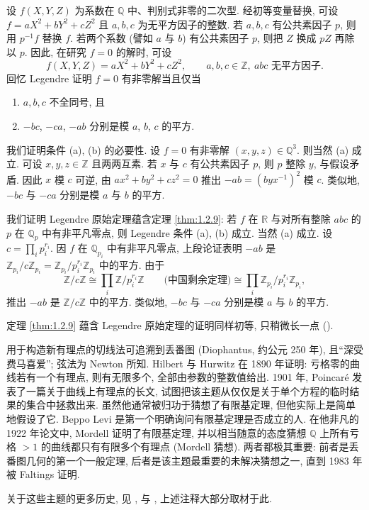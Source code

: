 \begin{aside} \label{thm:1.2.18} 
设 $f(X,Y,Z)$ 为系数在 $\mathbb{Q}$ 中、判别式非零的二次型. 经初等变量替换, 可设 $f = aX^2 + bY^2 + cZ^2$ 且 $a,b,c$ 为无平方因子的整数. 若 $a, b, c$ 有公共素因子 $p$, 则用 $p^{-1}f$ 替换 $f$. 若两个系数 (譬如 $a$ 与 $b$) 有公共素因子 $p$, 则把 $Z$ 换成 $pZ$ 再除以 $p$. 因此, 在研究 $f = 0$ 的解时, 可设
\[
f(X,Y,Z) = aX^2 + bY^2 + cZ^2, \qquad a,b,c\in\mathbb{Z}, \ abc \text{ 无平方因子}.
\]
回忆 Legendre 证明 $f = 0$ 有非零解当且仅当
\begin{enumerate}[label=\textup{(\alph*)}]
\item $a,b,c$ 不全同号, 且
\item $-bc$, $-ca$, $-ab$ 分别是模 $a$, $b$, $c$ 的平方.
\end{enumerate}
我们证明条件 (a), (b) 的必要性. 设 $f = 0$ 有非零解 $(x,y,z)\in\mathbb{Q}^3$. 则当然 (a) 成立. 可设 $x,y,z\in\mathbb{Z}$ 且两两互素. 若 $x$ 与 $c$ 有公共素因子 $p$, 则 $p$ 整除 $y$, 与假设矛盾. 因此 $x$ 模 $c$ 可逆, 由 $ax^2 + by^2 + cz^2 = 0$ 推出 $-ab = (byx^{-1})^2$ 模 $c$. 类似地, $-bc$ 与 $-ca$ 分别是模 $a$ 与 $b$ 的平方.

我们证明 Legendre 原始定理蕴含定理 \ref{thm:1.2.9}: 若 $f$ 在 $\mathbb{R}$ 与对所有整除 $abc$ 的 $p$ 在 $\mathbb{Q}_p$ 中有非平凡零点, 则 Legendre 条件 (a), (b) 成立. 当然 (a) 成立. 设 $c = \prod_i p_i^{r_i}$. 因 $f$ 在 $\mathbb{Q}_{p_i}$ 中有非平凡零点, 上段论证表明 $-ab$ 是 $\mathbb{Z}_{p_i}/c\mathbb{Z}_{p_i} = \mathbb{Z}_{p_i}/p_i^{r_i}\mathbb{Z}_{p_i}$ 中的平方. 由于
\[
\mathbb{Z}/c\mathbb{Z} \cong \prod_i \mathbb{Z}/p_i^{r_i}\mathbb{Z} \qquad \text{(中国剩余定理)} \cong \prod_i \mathbb{Z}_{p_i}/p_i^{r_i}\mathbb{Z}_{p_i},
\]
推出 $-ab$ 是 $\mathbb{Z}/c\mathbb{Z}$ 中的平方. 类似地, $-bc$ 与 $-ca$ 分别是模 $a$ 与 $b$ 的平方.

定理 \ref{thm:1.2.9} 蕴含 Legendre 原始定理的证明同样初等, 只稍微长一点 (\cite{liu2019}).
\end{aside}

\begin{remarkstar}
用于构造新有理点的切线法可追溯到丢番图 (Diophantus, 约公元 250 年), 且``深受费马喜爱''; 弦法为 Newton 所知. Hilbert 与 Hurwitz 在 1890 年证明: 亏格零的曲线若有一个有理点, 则有无限多个, 全部由参数的整数值给出. 1901 年, Poincar\'e 发表了一篇关于曲线上有理点的长文, 试图把该主题从仅仅是关于单个方程的临时结果的集合中拯救出来. 虽然他通常被归功于猜想了有限基定理, 但他实际上是简单地假设了它. Beppo Levi 是第一个明确询问有限基定理是否成立的人. 在他非凡的 1922 年论文中, Mordell 证明了有限基定理, 并以相当随意的态度猜想 $\mathbb{Q}$ 上所有亏格 $> 1$ 的曲线都只有有限多个有理点 (Mordell 猜想). 两者都极其重要: 前者是丢番图几何的第一个一般定理, 后者是该主题最重要的未解决猜想之一, 直到 1983 年被 Faltings 证明.

关于这些主题的更多历史, 见 \cite{cassels1986}, \cite{schappacher1990} 与 \cite{schappacher1996}, 上述注释大部分取材于此.
\end{remarkstar}

